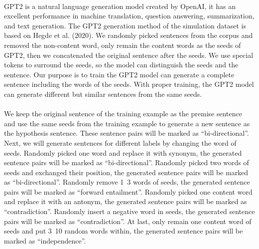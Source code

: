 \documentclass{article}
\begin{document}
\begin{CJK*}{UTF8}{bkai}
\paragraph{}
GPT2\cite{radford2019language} is a natural language generation model created by OpenAI, it has an excellent performance in machine translation, question answering, summarization, and text generation. The GPT2 generation method of the simulation dataset is based on Hegde et al. (2020)\cite{hegde2020unsupervised}. We randomly picked sentences from the corpus and removed the non-content word, only remain the content words as the seeds of GPT2, then we concatenated the original sentence after the seeds. We use special tokens to surround the seeds, so the model can distinguish the seeds and the sentence. Our purpose is to train the GPT2 model can generate a complete sentence including the words of the seeds. With proper training, the GPT2 model can generate different but similar sentences from the same seeds.

\paragraph{}
We keep the original sentence of the training example as the premise sentence and use the same seeds from the training example to generate a new sentence as the hypothesis sentence. These sentence pairs will be marked as ``bi-directional''. Next, we will generate sentences for different labels by changing the word of seeds. Randomly picked one word and replace it with synonym, the generated sentence pairs will be marked as ``bi-directional''. Randomly picked two words of seeds and exchanged their position, the generated sentence pairs will be marked as ``bi-directional''. Randomly remove 1~3 words of seeds, the generated sentence pairs will be marked as ``forward entailment''. Randomly picked one content word and replace it with an antonym, the generated sentence pairs will be marked as ``contradiction''. Randomly insert a negative word in seeds, the generated sentence pairs will be marked as ``contradiction''. At last, only remain one content word of seeds and put 3~10 random words within, the generated sentence pairs will be marked as ``independence''.


\end{CJK*}
\end{document}
